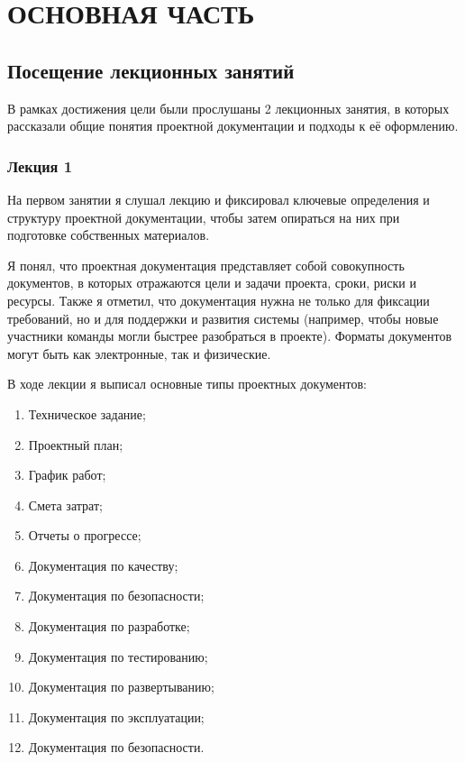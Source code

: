 \section{ОСНОВНАЯ ЧАСТЬ}



\subsection{Посещение лекционных занятий}

В рамках достижения цели были прослушаны 2 лекционных занятия, в которых рассказали общие понятия проектной документации и подходы к её оформлению.

\subsubsection{Лекция 1}

На первом занятии я слушал лекцию и фиксировал ключевые определения и структуру проектной документации, 
чтобы затем опираться на них при подготовке собственных материалов.

Я понял, что проектная документация представляет собой совокупность документов, 
в которых отражаются цели и задачи проекта, сроки, риски и ресурсы.
Также я отметил, что документация нужна не только для фиксации требований, 
но и для поддержки и развития системы (например, чтобы новые участники команды могли быстрее разобраться в проекте). 
Форматы документов могут быть как электронные, так и физические.

В ходе лекции я выписал основные типы проектных документов:
\begin{enumerate}[label=\arabic*)]
  \item Техническое задание;
  \item Проектный план;
  \item График работ;
  \item Смета затрат;
  \item Отчеты о прогрессе;
  \item Документация по качеству;
  \item Документация по безопасности;
  \item Документация по разработке;
  \item Документация по тестированию;
  \item Документация по развертыванию;
  \item Документация по эксплуатации;
  \item Документация по безопасности.
\end{enumerate}

